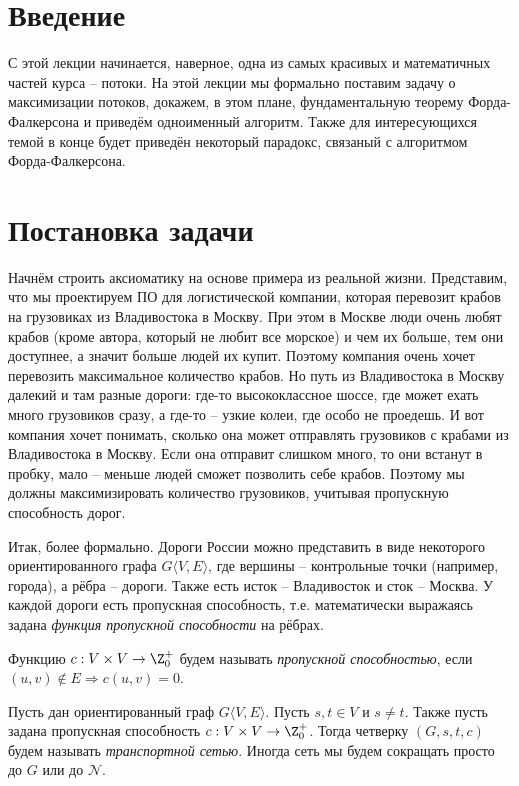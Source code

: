 \section{Введение}

С этой лекции начинается, наверное, одна из самых красивых и математичных частей курса -- потоки. 
На этой лекции мы формально поставим задачу о максимизации потоков, докажем, в этом плане, фундаментальную теорему Форда-Фалкерсона и приведём одноименный алгоритм. 
Также для интересующихся темой в конце будет приведён некоторый парадокс, связаный с алгоритмом Форда-Фалкерсона.

\section{Постановка задачи}

Начнём строить аксиоматику на основе примера из реальной жизни. 
Представим, что мы проектируем ПО для логистической компании, которая перевозит крабов на грузовиках из Владивостока в Москву.
При этом в Москве люди очень любят крабов (кроме автора, который не любит все морское) и чем их больше, тем они доступнее, а значит больше людей их купит.
Поэтому компания очень хочет перевозить максимальное количество крабов. Но путь из Владивостока в Москву далекий и там разные дороги: где-то высококлассное шоссе, где может ехать много грузовиков сразу, а где-то -- узкие колеи, где особо не проедешь.
И вот компания хочет понимать, сколько она может отправлять грузовиков с крабами из Владивостока в Москву. 
Если она отправит слишком много, то они встанут в пробку, мало -- меньше людей сможет позволить себе крабов.
Поэтому мы должны максимизировать количество грузовиков, учитывая пропускную способность дорог.

Итак, более формально. Дороги России можно представить в виде некоторого ориентированного графа $G \langle V, E \rangle$, где вершины -- контрольные точки (например, города), а рёбра -- дороги. Также есть исток -- Владивосток и сток -- Москва.
У каждой дороги есть пропускная способность, т.е. математически выражаясь задана \textit{функция пропускной способности} на рёбрах.

\Def Функцию $c: V \times V \to \Z^+_0$ будем называть \textit{пропускной способностью}, если $(u, v) \not\in E \Rightarrow c(u, v) = 0$.

\Def Пусть дан ориентированный граф $G \langle V, E \rangle$. Пусть $s, t \in V$ и $s \neq t$. Также пусть задана пропускная способность $c: V \times V \to \Z_0^+$. Тогда четверку $(G, s, t, c)$ будем называть \textit{транспортной сетью}.
Иногда сеть мы будем сокращать просто до $G$ или до $\mathcal{N}$.

